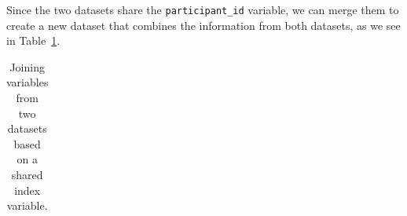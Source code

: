 \documentclass[
  letterpaper,
]{latex/krantz}
\theoremstyle{definition}
\theoremstyle{remark}
\begin{document}
Since the two datasets share the \texttt{participant\_id} variable, we
can merge them to create a new dataset that combines the information
from both datasets, as we see in Table~\ref{tbl-ud-merge-join}.

\begin{longtable}[]{@{}
  >{\raggedright\arraybackslash}p{}
  >{\raggedright\arraybackslash}p{}
  >{\raggedright\arraybackslash}p{}
  >{\raggedright\arraybackslash}p{}
  >{\raggedright\arraybackslash}p{}
  >{\raggedright\arraybackslash}p{}
  >{\raggedright\arraybackslash}p{}@{}}

\caption{\label{tbl-ud-merge-join}Joining variables from two datasets
based on a shared index variable.}

\tabularnewline


\end{longtable}
\end{document}
